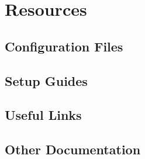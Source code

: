 %
\chapter{Resources}
\label{sec:res}



\section{Configuration Files}
\label{sec:res:configs}

\section{Setup Guides}
\label{sec:res:setup}

\section{Useful Links}
\label{sec:res:useful}

\section{Other Documentation}
\label{sec:res:other}


